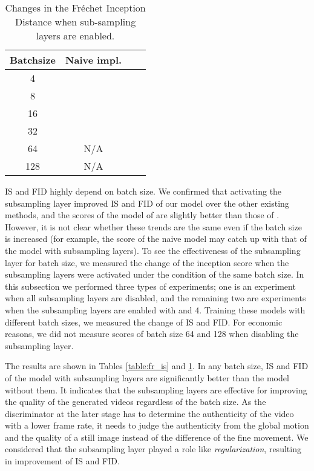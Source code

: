 \documentclass[twocolumn]{svjour3}
\begin{document}
\begin{table}
\centering
{\renewcommand{\arraystretch}{1.2}
\begin{tabular}{c|ccc}
Batchsize & Naive impl. &  &  \\ \hline \hline
4 & {} &  &  \\
8 & {} & {} &  \\
16 & {} & {} &  \\
32 & {} & {} &  \\
64 & N/A &  &  \\
128 & N/A & {} & {} \\ \hline
\end{tabular}
}
\caption{Changes in the Fr\'echet Inception Distance when sub-sampling layers are enabled.}
\label{table:fr_fid}
\end{table}


















IS and FID highly depend on batch size.
We confirmed that activating the subsampling layer improved IS and FID of our model over the other existing methods,
and the scores of the model of  are slightly better than those of .
However, it is not clear whether these trends are the same even if the batch size is increased
(for example, the score of the naive model may catch up with that of the model with subsampling layers).
To see the effectiveness of the subsampling layer for batch size,
we measured the change of the inception score when the subsampling layers were activated
under the condition of the same batch size.
In this subsection we performed three types of experiments;
one is an experiment when all subsampling layers are disabled,
and the remaining two are experiments when the subsampling layers are enabled with  and 4.
Training these models with different batch sizes,
we measured the change of IS and FID.
For economic reasons, we did not measure scores of batch size 64 and 128
when disabling the subsampling layer.










The results are shown in Tables \ref{table:fr_is} and \ref{table:fr_fid}.
In any batch size, IS and FID of the model with subsampling layers
are significantly better than the model without them.
It indicates that the subsampling layers are effective for improving the quality of the generated videos
regardless of the batch size.
As the discriminator at the later stage has to determine the authenticity of the video with a lower frame rate,
it needs to judge the authenticity from the global motion and
the quality of a still image instead of the difference of the fine movement.
We considered that the subsampling layer played a role like {\em regularization},
resulting in improvement of IS and FID.
\end{document}
